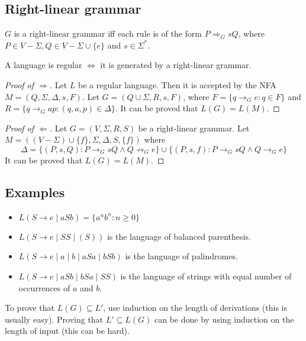 \subsection{Right-linear grammar}

\begin{definition}
$G$ is a right-linear grammar iff each rule is of the form $P \Rightarrow_G sQ$,
where $P \in V - \Sigma, Q \in V - \Sigma \cup \{e\}$ and $s \in \Sigma^*$.
\end{definition}
\begin{theorem}A language is regular $\iff$ it is generated by a right-linear grammar.\end{theorem}
\begin{proof}[Proof of $\Rightarrow$]
Let $L$ be a regular language. Then it is accepted by the NFA $M = (Q, \Sigma, \Delta, s, F)$.
Let $G = (Q \cup \Sigma, R, s, F)$, where $F = \{q \rightarrow_G e: q \in F\}$
and $R = \{q \rightarrow_G ap: (q, a, p) \in \Delta\}$.
It can be proved that $L(G) = L(M)$.
\end{proof}
\begin{proof}[Proof of $\Leftarrow$]
Let $G = (V, \Sigma, R, S)$ be a right-linear grammar.
Let $M = ((V-\Sigma) \cup \{f\}, \Sigma, \Delta, S, \{f\})$ where
\[ \Delta = \{(P, s, Q): P \rightarrow_G sQ \wedge Q \not\rightarrow_G e \}
\cup \{(P, s, f): P \rightarrow_G sQ \wedge Q \rightarrow_G e \} \]
It can be proved that $L(G) = L(M)$.
\end{proof}

\subsection{Examples}
\begin{itemize}
\item $L(S \rightarrow e \mid aSb) = \{a^nb^n: n \ge 0\}$
\item $L(S \rightarrow e \mid SS \mid (S))$ is the language of balanced parenthesis.
\item $L(S \rightarrow e \mid a \mid b \mid aSa \mid bSb)$ is the language of palindromes.
\item $L(S \rightarrow e \mid aSb \mid bSa \mid SS)$ is the language of strings with
  equal number of occurrences of $a$ and $b$.
\end{itemize}

To prove that $L(G) \subseteq L'$, use induction on the length of derivations
(this is usually easy).
Proving that $L' \subseteq L(G)$ can be done by using induction on the length of input
(this can be hard).


